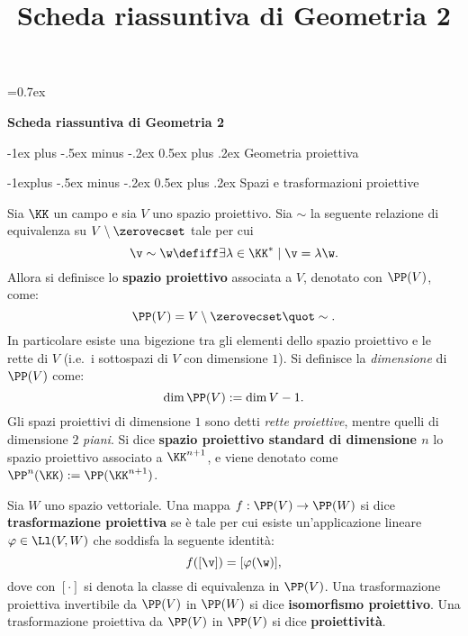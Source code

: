 \documentclass[10pt,landscape]{article}
\title{Scheda riassuntiva di Geometria 2}
\makeatletter
\renewcommand{\section}{\@startsection{section}{1}{0mm}%
	{-1ex plus -.5ex minus -.2ex}%
	{0.5ex plus .2ex}%
	{\normalfont\large\bfseries}}
\renewcommand{\subsection}{\@startsection{subsection}{2}{0mm}%
	{-1explus -.5ex minus -.2ex}%
	{0.5ex plus .2ex}%
	{\normalfont\normalsize\bfseries}}
\makeatother
\begin{document}
	
	\parskip=0.7ex
	
	\raggedright
	\footnotesize
	
	\begin{center}
		\Large{\textbf{Scheda riassuntiva di Geometria 2}} \\
	\end{center}
	\begin{multicols}{3}
		\setlength{\premulticols}{1pt}
		\setlength{\postmulticols}{1pt}
		\setlength{\multicolsep}{1pt}
		\setlength{\columnsep}{2pt}
		
		\section{Geometria proiettiva}
		
		\subsection{Spazi e trasformazioni proiettive}

		Sia $\KK$ un campo e sia $V$ uno spazio proiettivo. Sia $\sim$ la seguente
		relazione di equivalenza su $V \setminus \zerovecset$ tale per cui
		\[ \v \sim \w \defiff \exists \lambda \in \KK^* \mid \v = \lambda \w. \]
		Allora si definisce lo \textbf{spazio proiettivo} associata a $V$, denotato
		con $\PP(V)$, come:
		\[ \PP(V) = V \setminus \zerovecset \quot \sim. \]
		In particolare esiste una bigezione tra gli elementi dello spazio proiettivo
		e le rette di $V$ (i.e.~i sottospazi di $V$ con dimensione $1$). Si definisce
		la \textit{dimensione} di $\PP(V)$ come:
		\[ \dim \PP(V) := \dim V - 1. \]
		Gli spazi proiettivi di dimensione $1$ sono detti \textit{rette proiettive},
		mentre quelli di dimensione $2$ \textit{piani}. Si dice
		\textbf{spazio proiettivo standard di dimensione $n$} lo spazio proiettivo
		associato a $\KK^{n+1}$, e viene denotato come $\PP^n(\KK) := \PP(\KK^{n+1})$. \medskip
		
		
		Sia $W$ uno spazio vettoriale. Una mappa $f : \PP(V) \to \PP(W)$ si dice
		\textbf{trasformazione proiettiva} se è tale per cui esiste un'applicazione
		lineare $\varphi \in \Ll(V, W)$ che soddisfa la seguente identità:
		\[ f([\v]) = [\varphi(\w)], \]
		dove con $[\cdot]$ si denota la classe di equivalenza in $\PP(V)$.
		Una trasformazione proiettiva invertibile da $\PP(V)$ in $\PP(W)$
		si dice \textbf{isomorfismo proiettivo}. Una
		trasformazione proiettiva da $\PP(V)$ in $\PP(V)$ si dice
		\textbf{proiettività}.
		

\end{multicols}
\end{document}
